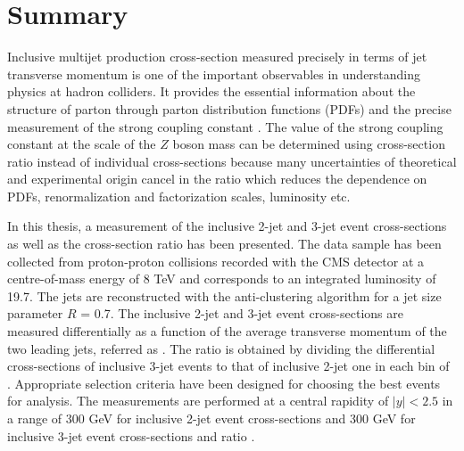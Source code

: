 \chapter{Summary}
\label{chap:Summary}
Inclusive multijet production cross-section measured precisely in terms of jet transverse momentum is one of the important observables in understanding physics at hadron colliders. It provides the essential information about the structure of parton through parton distribution functions (PDFs) and the precise measurement of the strong coupling constant \alps. The value of the strong coupling constant at the scale of the $Z$ boson mass \alpsmz can be determined using cross-section ratio instead of individual cross-sections because many uncertainties of theoretical and experimental origin cancel in the ratio which reduces the dependence on PDFs, renormalization and factorization scales, luminosity etc.

In this thesis, a measurement of the inclusive 2-jet and 3-jet event cross-sections as well as the cross-section ratio \ratio has been presented. The data sample has been collected from proton-proton collisions recorded with the CMS detector at a centre-of-mass energy of 8 TeV and corresponds to an integrated luminosity of 19.7\fbinv. The jets are reconstructed with the anti-\kt clustering algorithm for a jet size parameter $R$ = 0.7. The inclusive 2-jet and 3-jet event cross-sections are measured differentially as a function of the average transverse momentum of the two leading jets, referred as \httwo. The ratio \ratio is obtained by dividing the differential cross-sections of inclusive 3-jet events to that of inclusive 2-jet one in each bin of \httwo. Appropriate selection criteria have been designed for choosing the best events for analysis. The measurements are performed at a central rapidity of $|y|<2.5$ in a range of 300 \ls \httwo {} GeV for inclusive 2-jet event cross-sections and 300 \ls \httwo {} GeV for inclusive 3-jet event cross-sections and ratio \ratio. 

